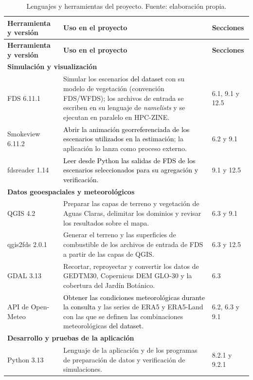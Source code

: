 \begin{longtable}{|p{}|p{}|p{}|}
\caption{Lenguajes y herramientas del proyecto. Fuente: elaboración propia.}\label{tab:herramientas}\\
\hline
\textbf{Herramienta y versión} & \textbf{Uso en el proyecto} & \textbf{Secciones}\tabularnewline\hline
\endfirsthead
\hline
\textbf{Herramienta y versión} & \textbf{Uso en el proyecto} & \textbf{Secciones}\tabularnewline\hline
\endhead
\multicolumn{3}{|l|}{\textbf{Simulación y visualización}}\tabularnewline\hline
\raggedright FDS 6.11.1~\cite{fdsuserguide,fdslinuxcluster} & \raggedright Simular los escenarios \textcolor{black}{del dataset} con su modelo de vegetación (convención FDS/WFDS); los archivos de entrada se escriben en su lenguaje de \textit{namelists} y se ejecutan en paralelo en HPC-ZINE. & \raggedright 6.1, 9.1 y 12.5\tabularnewline\hline
\raggedright Smokeview 6.11.2~\cite{forney2013smv} & \raggedright \textcolor{black}{Abrir la animación georreferenciada de los escenarios utilizados en la estimación}; la aplicación lo lanza como proceso externo. & \raggedright 6.2 y 9.1\tabularnewline\hline
\raggedright fdsreader 1.14~\cite{fdsreader} & \raggedright \textcolor{black}{Leer desde Python las salidas de FDS de los escenarios seleccionados para su agregación y verificación.} & \raggedright 9.1 y 12.5\tabularnewline\hline
\multicolumn{3}{|l|}{\textbf{Datos geoespaciales y meteorológicos}}\tabularnewline\hline
\raggedright QGIS 4.2~\cite{qgis} & \raggedright Preparar las capas de terreno y vegetación de Aguas Claras, delimitar los dominios y revisar los resultados sobre el mapa. & \raggedright 6.3 y 9.1\tabularnewline\hline
\raggedright qgis2fds 2.0.1~\cite{qgis2fds} & \raggedright Generar el terreno y las superficies de combustible de los archivos de entrada de FDS a partir de las capas de QGIS. & \raggedright 6.3 y 12.5\tabularnewline\hline
\raggedright GDAL 3.13~\cite{gdal} & \raggedright Recortar, reproyectar y convertir los datos de GEDTM30, Copernicus DEM GLO-30 y la cobertura del Jardín Botánico. & \raggedright 6.3\tabularnewline\hline
\raggedright API de Open-Meteo~\cite{openmeteo} & \raggedright \textcolor{black}{Obtener las condiciones meteorológicas durante la consulta} y las series de ERA5 y ERA5-Land con las que se definen las combinaciones meteorológicas \textcolor{black}{del dataset}. & \raggedright 6.2, 6.3 y 9.1\tabularnewline\hline
\multicolumn{3}{|l|}{\textbf{Desarrollo y pruebas de la aplicación}}\tabularnewline\hline
\raggedright Python 3.13~\cite{python313} & \raggedright Lenguaje de la aplicación y de los programas de preparación de datos y verificación de simulaciones. & \raggedright 8.2.1 y 9.2.1\tabularnewline\hline

\end{longtable}
